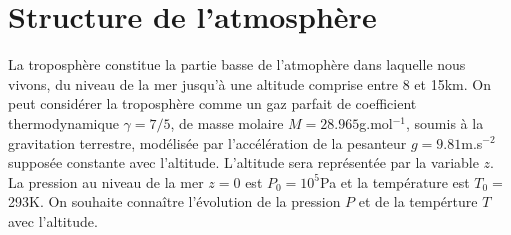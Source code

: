 \documentclass{report}
\begin{document}
\newpage

\section*{Structure de l'atmosphère}

La troposphère constitue la partie basse de l'atmophère dans laquelle nous vivons, du niveau de la mer jusqu'à une altitude comprise entre 8 et 15km. On peut considérer la troposphère comme un gaz parfait de coefficient thermodynamique $\gamma=7/5$, de masse molaire $M=28.965$g.mol$^{-1}$, soumis à la gravitation terrestre, modélisée par l'accélération de la pesanteur $g=9.81$m.s$^{-2}$ supposée constante avec l'altitude. L'altitude sera représentée par la variable $z$. La pression au niveau de la mer $z=0$ est $P_0=10^5$Pa et la température est $T_0=$293K. On souhaite connaître l'évolution de la pression $P$ et de la tempérture $T$ avec l'altitude.
\end{document}

